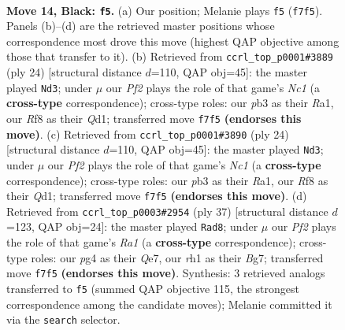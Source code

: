 \documentclass[11pt]{article}
\begin{document}
\clearpage

\begin{figure}[p]\centering
\begin{subfigure}{0.46\textwidth}\centering
\resizebox{\linewidth}{!}{%
\newchessgame
\chessboard[
  setfen={rnb2rk1/ppp2p1p/1n2p1p1/3pP2P/1P1P1PP1/1PN5/P7/3QKBNR b K - 0 14},
  showmover=false,
  pgfstyle=straightmove, color=movearrow, markmove={f7-f5}
]}
\caption{}
\end{subfigure}\hfill
\begin{subfigure}{0.46\textwidth}\centering
\resizebox{\linewidth}{!}{%
\newchessgame
\chessboard[
  setfen={r1bqk2r/1pp2p2/n2p2pn/p2Pp3/2P1P2p/2N3P1/PP3PBP/R1NQK2R w KQkq - 2 13},
  showmover=false,
  pgfstyle=straightmove, color=movearrow, markmove={c1-d3}
]}
\caption{}
\end{subfigure}
\\[4pt]
\begin{subfigure}{0.46\textwidth}\centering
\resizebox{\linewidth}{!}{%
\newchessgame
\chessboard[
  setfen={r1bqk2r/1pp2p2/n2p2pn/p2Pp3/2P1P2p/2N3P1/PP3PBP/R1NQK2R w KQkq - 2 13},
  showmover=false,
  pgfstyle=straightmove, color=movearrow, markmove={c1-d3}
]}
\caption{}
\end{subfigure}\hfill
\begin{subfigure}{0.46\textwidth}\centering
\resizebox{\linewidth}{!}{%
\newchessgame
\chessboard[
  setfen={r6r/4qkb1/1pp1npp1/p1p1p2p/P1P1P2N/R3B2P/1PP2PP1/2QR3K b - - 5 19},
  showmover=false,
  pgfstyle=straightmove, color=movearrow, markmove={a8-d8}
]}
\caption{}
\end{subfigure}
\caption{\textbf{Move 14, Black: \texttt{f5}.} (a) Our position; Melanie plays \texttt{f5} (\texttt{f7f5}). Panels (b)--(d) are the retrieved master positions whose correspondence most drove this move (highest QAP objective among those that transfer to it). (b) Retrieved from \texttt{ccrl\_top\_p0001\#3889} (ply 24) [structural distance $d$=110, QAP obj=45]: the master played \texttt{Nd3}; under $\mu$ our \emph{Pf2} plays the role of that game's \emph{Nc1} (a \textbf{cross-type} correspondence); cross-type roles: our \emph{p}b3 as their \emph{R}a1, our \emph{R}f8 as their \emph{Q}d1; transferred move \texttt{f7f5} \textbf{(endorses this move)}. (c) Retrieved from \texttt{ccrl\_top\_p0001\#3890} (ply 24) [structural distance $d$=110, QAP obj=45]: the master played \texttt{Nd3}; under $\mu$ our \emph{Pf2} plays the role of that game's \emph{Nc1} (a \textbf{cross-type} correspondence); cross-type roles: our \emph{p}b3 as their \emph{R}a1, our \emph{R}f8 as their \emph{Q}d1; transferred move \texttt{f7f5} \textbf{(endorses this move)}. (d) Retrieved from \texttt{ccrl\_top\_p0003\#2954} (ply 37) [structural distance $d$=123, QAP obj=24]: the master played \texttt{Rad8}; under $\mu$ our \emph{Pf2} plays the role of that game's \emph{Ra1} (a \textbf{cross-type} correspondence); cross-type roles: our \emph{p}g4 as their \emph{Q}e7, our \emph{r}h1 as their \emph{B}g7; transferred move \texttt{f7f5} \textbf{(endorses this move)}. Synthesis: 3 retrieved analogs transferred to \texttt{f5} (summed QAP objective 115, the strongest correspondence among the candidate moves); Melanie committed it via the \texttt{search} selector.}

\end{figure}
\end{document}
